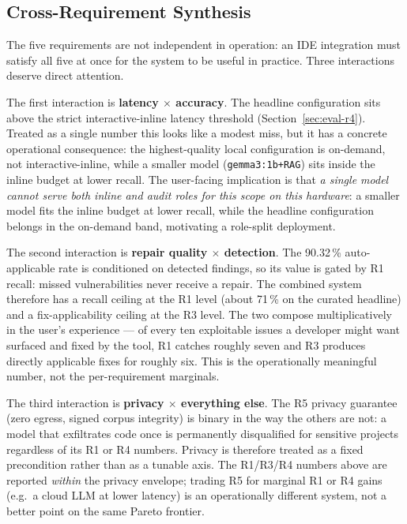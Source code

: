 \subsection{Cross-Requirement Synthesis}
\label{sec:eval-cross-requirement}

The five requirements are not independent in operation: an IDE integration must satisfy all five at once for the system to be useful in practice. Three interactions deserve direct attention.

The first interaction is \textbf{latency $\times$ accuracy}. The headline configuration sits above the strict interactive-inline latency threshold (Section~\ref{sec:eval-r4}). Treated as a single number this looks like a modest miss, but it has a concrete operational consequence: the highest-quality local configuration is on-demand, not interactive-inline, while a smaller model (\texttt{gemma3:1b+RAG}) sits inside the inline budget at lower recall. The user-facing implication is that \emph{a single model cannot serve both inline and audit roles for this scope on this hardware}: a smaller model fits the inline budget at lower recall, while the headline configuration belongs in the on-demand band, motivating a role-split deployment.

The second interaction is \textbf{repair quality $\times$ detection}. The 90.32\,\% auto-applicable rate is conditioned on detected findings, so its value is gated by R1 recall: missed vulnerabilities never receive a repair. The combined system therefore has a recall ceiling at the R1 level (about 71\,\% on the curated headline) and a fix-applicability ceiling at the R3 level. The two compose multiplicatively in the user's experience --- of every ten exploitable issues a developer might want surfaced and fixed by the tool, R1 catches roughly seven and R3 produces directly applicable fixes for roughly six. This is the operationally meaningful number, not the per-requirement marginals.

The third interaction is \textbf{privacy $\times$ everything else}. The R5 privacy guarantee (zero egress, signed corpus integrity) is binary in the way the others are not: a model that exfiltrates code once is permanently disqualified for sensitive projects regardless of its R1 or R4 numbers. Privacy is therefore treated as a fixed precondition rather than as a tunable axis. The R1/R3/R4 numbers above are reported \emph{within} the privacy envelope; trading R5 for marginal R1 or R4 gains (e.g.\ a cloud LLM at lower latency) is an operationally different system, not a better point on the same Pareto frontier.

